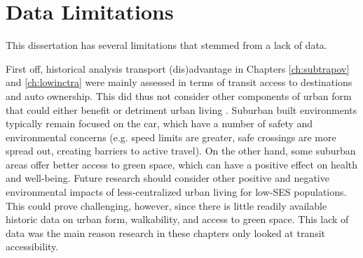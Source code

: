 





\section{Data Limitations}

This dissertation has several limitations that stemmed from a lack of data.

First off, historical analysis transport (dis)advantage in Chapters \ref{ch:subtrapov} and \ref{ch:lowinctra} were mainly assessed in terms of transit access to destinations and auto ownership. This did thus not consider other components of urban form that could either benefit or detriment urban living \cite{ewing_relationship_2003,ewing2014measuring}. Suburban built environments typically remain focused on the car, which have a number of safety and environmental concerns (e.g. speed limits are greater, safe crossings are more spread out, creating barriers to active travel). On the other hand, some suburban areas offer better access to green space, which can have a positive effect on health and well-being. Future research should consider other positive and negative environmental impacts of less-centralized urban living for low-SES populations. This could prove challenging, however, since there is little readily available historic data on urban form, walkability, and access to green space. This lack of data was the main reason research in these chapters only looked at transit accessibility.


